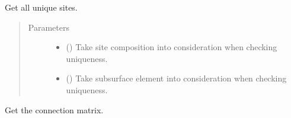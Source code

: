 \documentclass[letterpaper,10pt,english]{sphinxmanual}
\begin{document}
\begin{fulllineitems}
\begin{fulllineitems}
\begin{quote}
\begin{description}
\begin{itemize}
\end{itemize}

\end{description}\end{quote}

\end{fulllineitems}


\begin{fulllineitems}
\label{\detokenize{modules:acat.adsorption_sites.SlabAdsorptionSites.get_unique_sites}}
Get all unique sites.
\begin{quote}\begin{description}
\item[{Parameters}] \leavevmode\begin{itemize}
\item {} 
 (\sphinxstyleliteralemphasis{\sphinxupquote{, }}) \textendash{} Take site composition into consideration when
checking uniqueness.

\item {} 
 (\sphinxstyleliteralemphasis{\sphinxupquote{, }}) \textendash{} Take subsurface element into consideration when
checking uniqueness.

\end{itemize}

\end{description}\end{quote}

\end{fulllineitems}


\begin{fulllineitems}
\label{\detokenize{modules:acat.adsorption_sites.SlabAdsorptionSites.get_connectivity}}
Get the connection matrix.


\end{fulllineitems}
\end{fulllineitems}
\end{document}
